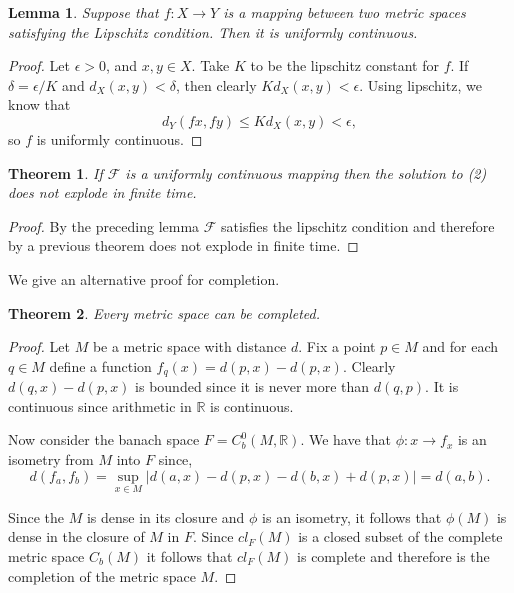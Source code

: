 \documentclass[letter]{article}
\newtheorem{theorem}{Theorem}
\newtheorem{lemma}{Lemma}
\newenvironment{menumerate}{%
  \edef\backupindent{\the\parindent}%
  \enumerate%
  \setlength{\parindent}{\backupindent}%
}{\endenumerate}
\begin{document}
\begin{menumerate}
    \begin{lemma}
        Suppose that $f: X \to Y$ is a mapping between two metric spaces satisfying the Lipschitz condition.
        Then it is uniformly continuous.
    \end{lemma}
    \begin{proof}
        Let $\epsilon > 0$, and $x,y \in X.$
        Take $K$ to be the lipschitz constant for $f$.
        If $\delta = \epsilon/K$ and $d_X(x,y) < \delta$,
        then clearly $Kd_X(x,y) < \epsilon.$
        Using lipschitz, we know that $$d_Y(fx,fy) \leq K d_X(x,y) < \epsilon,$$
        so $f$ is uniformly continuous.
    \end{proof}

    \begin{theorem}
        If $\mathcal{F}$ is a uniformly continuous mapping then the solution
        to (2) does not explode in finite time.
    \end{theorem}
    \begin{proof}
        By the preceding lemma $\mathcal{F}$ satisfies the lipschitz condition
        and therefore by a previous theorem does not explode in finite time.
    \end{proof}

\setcounter{enumi}{38}
\item We give an alternative proof for completion.
    \begin{theorem}
    Every metric space can be completed.
    \end{theorem}
    \begin{proof}
        Let $M$ be a metric space with distance $d.$ Fix a point $p\in M$
        and for each $q \in M$ define a function $f_q(x) = d(p,x) - d(p,x).$
        Clearly $d(q,x) - d(p,x)$ is bounded since it is never more than $d(q,p).$
        It is continuous since arithmetic in $\mathbb{R}$ is continuous.

        Now consider the banach space $F = C_b^0(M, \mathbb{R})$. We have that
        $\phi: x \to f_x$ is an isometry from $M$ into $F$ since,
        \begin{equation}
            d(f_a,f_b) = \sup_{x\in M}|d(a,x) - d(p,x) - d(b,x) + d(p,x)| = d(a,b).
        \end{equation}

        Since the $M$ is dense in its closure and $\phi$ is an isometry,
        it follows that $\phi(M)$ is dense in the closure of $M$ in $F$.
        Since $cl_F(M)$ is a closed subset of the complete metric space $C_b(M)$
        it follows that $cl_F(M)$ is complete and therefore is the completion
        of the metric space $M.$
    \end{proof}



\end{menumerate}
\end{document}
